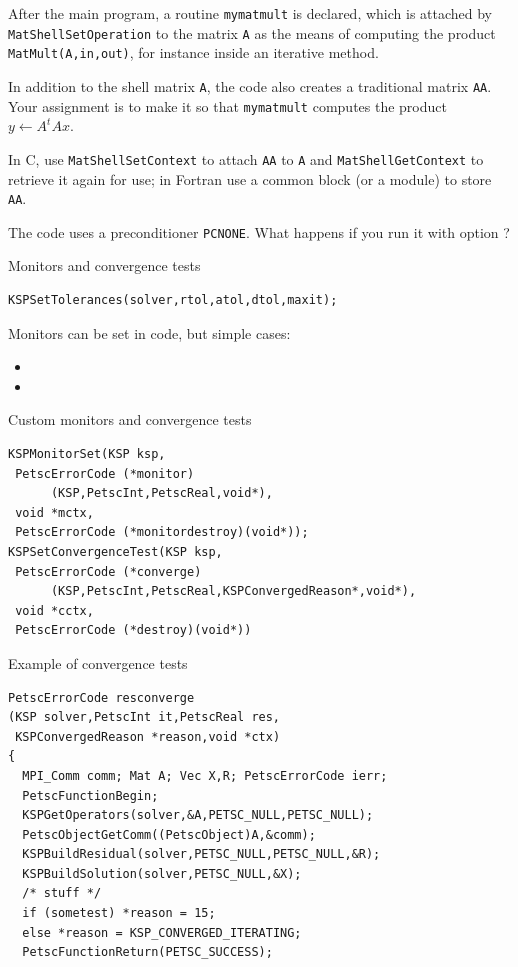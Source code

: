\begin{longstory}

\begin{exerciseframe}[shell]
  After the main program, a routine \lstinline{mymatmult} is
  declared, which is attached by \lstinline{MatShellSetOperation} to the matrix
  \lstinline{A} as the means of computing the product \lstinline{MatMult(A,in,out)}, for
  instance inside an iterative method.

  In addition to the shell matrix \lstinline{A}, the code also creates a
  traditional matrix \lstinline{AA}. Your assignment is to make it so that
  \lstinline{mymatmult} computes the product $y\leftarrow A^tAx$.

  In C, use \lstinline{MatShellSetContext} to attach \lstinline{AA} to \lstinline{A} and
  \lstinline{MatShellGetContext} to retrieve it again for use; in Fortran use a
  common block (or a module) to store \lstinline{AA}.

  The code uses a preconditioner \lstinline{PCNONE}. What happens if you run it
  with option ?
\end{exerciseframe}

\begin{numberedframe}{Monitors and convergence tests}
\begin{lstlisting}
KSPSetTolerances(solver,rtol,atol,dtol,maxit);
\end{lstlisting}
Monitors can be set in code, but simple cases:
\begin{itemize}
\item {}
\item {}
\end{itemize}
\end{numberedframe}

\begin{numberedframe}{Custom monitors and convergence tests}
\begin{lstlisting}
KSPMonitorSet(KSP ksp,
 PetscErrorCode (*monitor)
      (KSP,PetscInt,PetscReal,void*),
 void *mctx,
 PetscErrorCode (*monitordestroy)(void*));
KSPSetConvergenceTest(KSP ksp,
 PetscErrorCode (*converge)
      (KSP,PetscInt,PetscReal,KSPConvergedReason*,void*),
 void *cctx,
 PetscErrorCode (*destroy)(void*))
\end{lstlisting}
\end{numberedframe}

\begin{numberedframe}{Example of convergence tests}
\begin{lstlisting}
PetscErrorCode resconverge
(KSP solver,PetscInt it,PetscReal res,
 KSPConvergedReason *reason,void *ctx)
{
  MPI_Comm comm; Mat A; Vec X,R; PetscErrorCode ierr;
  PetscFunctionBegin;
  KSPGetOperators(solver,&A,PETSC_NULL,PETSC_NULL);
  PetscObjectGetComm((PetscObject)A,&comm); 
  KSPBuildResidual(solver,PETSC_NULL,PETSC_NULL,&R);
  KSPBuildSolution(solver,PETSC_NULL,&X); 
  /* stuff */
  if (sometest) *reason = 15;
  else *reason = KSP_CONVERGED_ITERATING;
  PetscFunctionReturn(PETSC_SUCCESS);
\end{lstlisting}
\end{numberedframe}


\end{longstory}
